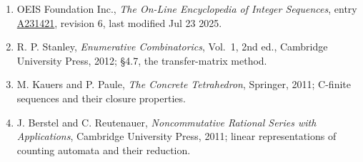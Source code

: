 \documentclass[11pt]{article}
\theoremstyle{definition}
\begin{document}
\begin{enumerate}

\item OEIS Foundation Inc., \emph{The On-Line Encyclopedia of Integer Sequences}, entry \href{https://oeis.org/A231421}{A231421}, revision 6, last modified Jul 23 2025.

\item R. P. Stanley, \emph{Enumerative Combinatorics}, Vol.~1, 2nd ed., Cambridge University Press, 2012; \S4.7, the transfer-matrix method.

\item M. Kauers and P. Paule, \emph{The Concrete Tetrahedron}, Springer, 2011; C-finite sequences and their closure properties.

\item J. Berstel and C. Reutenauer, \emph{Noncommutative Rational Series with Applications}, Cambridge University Press, 2011; linear representations of counting automata and their reduction.

\end{enumerate}
\end{document}
